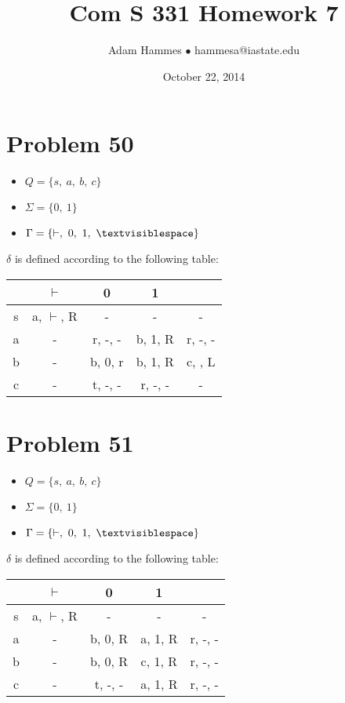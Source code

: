 \documentclass[11pt]{article}
\begin{document}
\title{Com S 331 Homework 7}
\author{Adam Hammes $\bullet$ hammesa@iastate.edu}
\date{October 22, 2014}
\maketitle

\section*{Problem 50}

\begin{itemize}
	\item $Q = \{ s,\ a,\ b,\ c \}$
	\item $\Sigma = \{0,\ 1\}$
	\item $\Gamma = \{ \vdash,\ 0,\ 1,\ \textvisiblespace\}$
\end{itemize}

$\delta$ is defined according to the following table:

\begin{tabular}{ c | c | c | c | c }
			& $\vdash$ 			& 0 					& 1 				& \textvisiblespace \\
			\hline
	s		& a, $\vdash$, R 	& -					& -				& - \\
	a		& - 						& r, -, -				& b, 1, R		&  r, -, -\\
	b		& -						& b, 0, r			& b, 1, R		& c, \textvisiblespace , L \\
	c		& -						& t, -, -				& r, -, -			& -
\end{tabular}


\section*{Problem 51}

\begin{itemize}
	\item $Q = \{ s,\ a,\ b,\ c \}$
	\item $\Sigma = \{0,\ 1\}$
	\item $\Gamma = \{ \vdash,\ 0,\ 1,\ \textvisiblespace\}$
\end{itemize}

$\delta$ is defined according to the following table:


\begin{tabular}{ c | c | c | c | c }
			& $\vdash$				& 0 					& 1				& \textvisiblespace \\
		\hline
		s	& a, $\vdash$, R		& -					& -				& - \\
		a	& -							& b, 0, R			& a, 1, R		& r, -, - \\
		b	& -							& b, 0, R			& c, 1, R		& r, -, - \\
		c	& -							& t, -, -				& a, 1, R		& r, -, -
\end{tabular}
\end{document}
